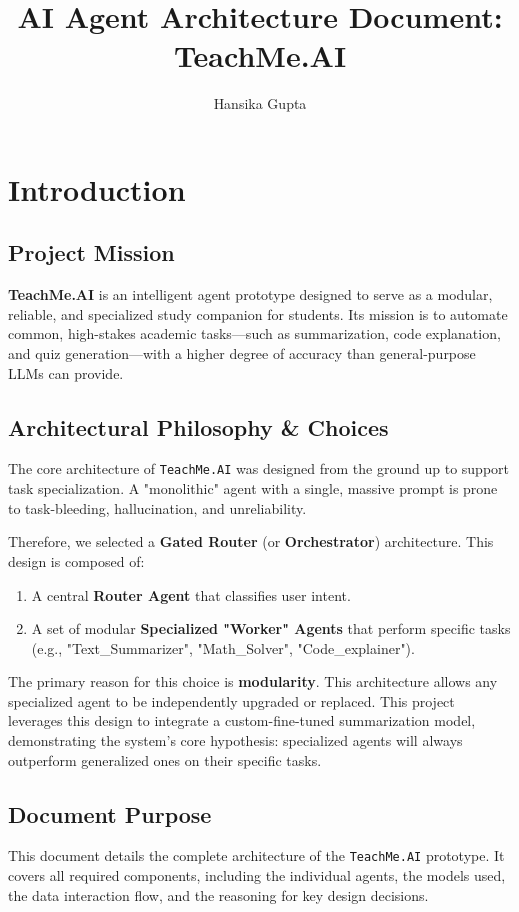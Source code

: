\documentclass{article}
\title{AI Agent Architecture Document: \protect\\ TeachMe.AI}
\author{Hansika Gupta}
\date{}
\begin{document}
\maketitle

\section{Introduction}

\subsection{Project Mission}
\textbf{TeachMe.AI} is an intelligent agent prototype designed to serve as a modular, reliable, and specialized study companion for students. Its mission is to automate common, high-stakes academic tasks—such as summarization, code explanation, and quiz generation—with a higher degree of accuracy than general-purpose LLMs can provide.

\subsection{Architectural Philosophy & Choices}
The core architecture of \texttt{TeachMe.AI} was designed from the ground up to support task specialization. A "monolithic" agent with a single, massive prompt is prone to task-bleeding, hallucination, and unreliability.

Therefore, we selected a \textbf{Gated Router} (or \textbf{Orchestrator}) architecture. This design is composed of:
\begin{enumerate}
    \item A central \textbf{Router Agent} that classifies user intent.
    \item A set of modular \textbf{Specialized "Worker" Agents} that perform specific tasks (e.g., "Text\_Summarizer", "Math\_Solver", "Code\_explainer").
    
\end{enumerate}

The primary reason for this choice is \textbf{modularity}. This architecture allows any specialized agent to be independently upgraded or replaced. This project leverages this design to integrate a custom-fine-tuned summarization model, demonstrating the system's core hypothesis: specialized agents will always outperform generalized ones on their specific tasks.

\subsection{Document Purpose}
This document details the complete architecture of the \texttt{TeachMe.AI} prototype. It covers all required components, including the individual agents, the models used, the data interaction flow, and the reasoning for key design decisions.
\end{document}
